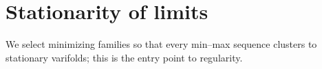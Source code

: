 \chapter{Stationarity of limits}

We select minimizing families so that every min--max sequence clusters to stationary varifolds; this is the entry point to regularity. \uses{}
